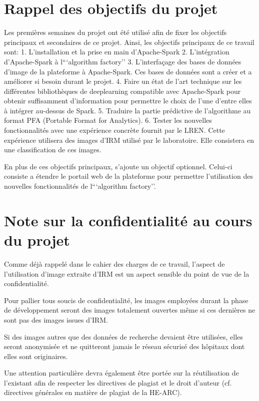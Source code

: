 \documentclass[a4paper,10pt,openany,oneside]{sphinxmanual}
\begin{document}
\section{Rappel des objectifs du projet}
\label{index:rappel-des-objectifs-du-projet}
Les premières semaines du projet ont été utilisé afin de fixer les objectifs principaux et secondaires de ce projet. Ainsi, les objectifs
principaux de ce travail sont:
1. L'installation et la prise en main d'Apache-Spark
2. L'intégration d'Apache-Spark à l```algorithm factory''
3. L'interfaçage des bases de données d'image de la plateforme à Apache-Spark. Ces bases de données sont a créer et a améliorer si besoin
durant le projet.
4. Faire un état de l'art technique sur les différentes bibliothèques de deeplearning compatible avec Apache-Spark pour obtenir suffisamment
d'information pour permettre le choix de l'une d'entre elles à intégrer au-dessus de Spark.
5. Traduire la partie prédictive de l'algorithme au format PFA (Portable Format for Analytics).
6. Tester les nouvelles fonctionnalités avec une expérience concrète fournit par le LREN. Cette expérience utilisera des images d'IRM utilisé
par le laboratoire. Elle consistera en une classification de ces images.

En plus de ces objectifs principaux, s'ajoute un objectif optionnel. Celui-ci consiste a étendre le portail web de la plateforme pour
permettre l'utilisation des nouvelles fonctionnalités de l```algorithm factory''.


\section{Note sur la confidentialité au cours du projet}
\label{index:note-sur-la-confidentialite-au-cours-du-projet}
Comme déjà rappelé dans le cahier des charges de ce travail, l’aspect de l’utilisation d’image extraite d’IRM est un aspect sensible du point
de vue de la confidentialité.

Pour pallier tous soucis de confidentialité, les images employées durant la phase de développement seront des images totalement ouvertes même
si ces dernières ne sont pas des images issues d’IRM.

Si des images autres que des données de recherche devaient être utilisées, elles seront anonymisée et ne quitteront jamais le réseau sécurisé des
hôpitaux dont elles sont originaires.

Une attention particulière devra également être portée sur la réutilisation de l’existant afin de respecter les directives de plagiat et le droit
d’auteur (cf. directives générales en matière de plagiat de la HE-ARC).
\end{document}
